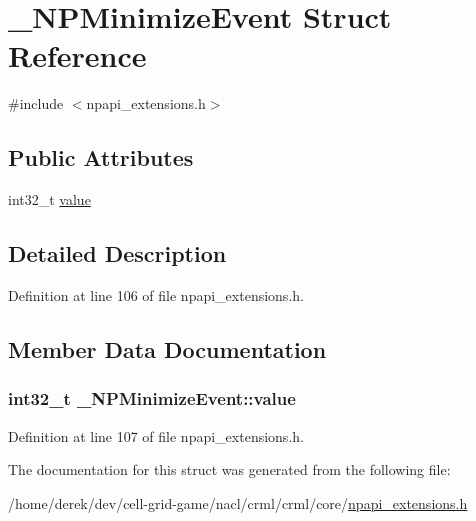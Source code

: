 \hypertarget{struct___n_p_minimize_event}{
\section{\_\-NPMinimizeEvent Struct Reference}
\label{struct___n_p_minimize_event}
}


{\ttfamily \#include $<$npapi\_\-extensions.h$>$}

\subsection*{Public Attributes}
\begin{DoxyCompactItemize}
\item 
int32\_\-t \hyperlink{struct___n_p_minimize_event_a2cbc0399cffd9b9d7b2b5e056ac61b02}{value}
\end{DoxyCompactItemize}


\subsection{Detailed Description}


Definition at line 106 of file npapi\_\-extensions.h.



\subsection{Member Data Documentation}
\hypertarget{struct___n_p_minimize_event_a2cbc0399cffd9b9d7b2b5e056ac61b02}{
\subsubsection[{value}]{\setlength{\rightskip}{0pt plus 5cm}int32\_\-t {\bf \_\-NPMinimizeEvent::value}}}
\label{struct___n_p_minimize_event_a2cbc0399cffd9b9d7b2b5e056ac61b02}


Definition at line 107 of file npapi\_\-extensions.h.



The documentation for this struct was generated from the following file:\begin{DoxyCompactItemize}
\item 
/home/derek/dev/cell-\/grid-\/game/nacl/crml/crml/core/\hyperlink{npapi__extensions_8h}{npapi\_\-extensions.h}\end{DoxyCompactItemize}
